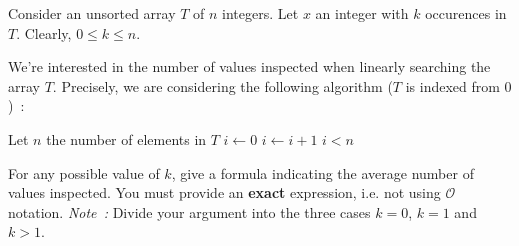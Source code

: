 \documentclass[12pt,addpoints]{exam}
\newcommand{\bigo}{\mathcal{O}}
\begin{document}
\begin{questions}
\question
Consider an unsorted array $T$ of $n$ integers. Let $x$ an integer with $k$ occurences in $T$. Clearly, $0 \leq k \leq n$.

We're interested in the number of values inspected when linearly searching the array $T$. Precisely, we are considering the following algorithm ($T$ is indexed from $0$)~:
\begin{algorithmic}[1]
    \State Let $n$ the number of elements in $T$
    \State $i \gets 0$
      \State $i \gets i + 1$
    \EndWhile
    \State \Return $i < n$
  \EndFunction
\end{algorithmic}
For any possible value of $k$, give a formula indicating the average number of values inspected.
You must provide an \textbf{exact} expression, i.e. not using $\bigo$ notation.
\emph{Note~:} Divide your argument into the three cases $k = 0$, $k = 1$ and $k > 1$.

\end{questions}
\end{document}
